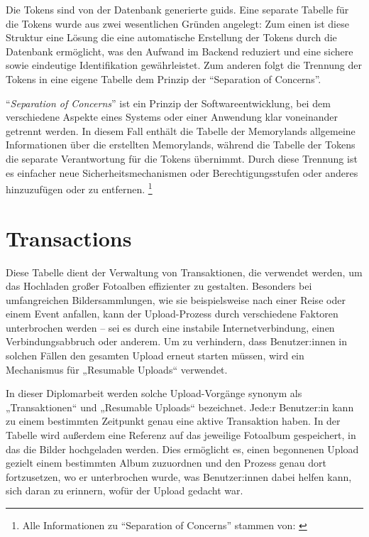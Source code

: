 Die Tokens sind von der Datenbank generierte \gls{guid}s. Eine separate Tabelle für die 
Tokens wurde aus zwei wesentlichen Gründen angelegt: Zum einen ist diese Struktur eine Lösung
die eine automatische Erstellung der Tokens durch die Datenbank ermöglicht, was den 
Aufwand im Backend reduziert und eine sichere sowie eindeutige Identifikation gewährleistet. 
Zum anderen folgt die Trennung der Tokens in eine eigene Tabelle dem Prinzip der 
``Separation of Concerns''.

``\emph{Separation of Concerns}'' ist ein Prinzip der Softwareentwicklung, bei dem 
verschiedene Aspekte eines Systems oder einer Anwendung klar voneinander getrennt werden. 
In diesem Fall enthält die Tabelle der Memorylands allgemeine Informationen über die 
erstellten Memorylands, während die Tabelle der Tokens die separate Verantwortung 
für die Tokens übernimmt. Durch diese Trennung ist es einfacher neue Sicherheitsmechanismen 
oder Berechtigungsstufen oder anderes hinzuzufügen oder zu entfernen.
\footnote{Alle Informationen zu ``Separation of Concerns'' stammen von: \cite{kulkarni2003separation}}

\section{Transactions}

Diese Tabelle dient der Verwaltung von Transaktionen, die verwendet werden, um das Hochladen 
großer Fotoalben effizienter zu gestalten. Besonders bei umfangreichen Bildersammlungen, 
wie sie beispielsweise nach einer Reise oder einem Event anfallen, kann der Upload-Prozess 
durch verschiedene Faktoren unterbrochen werden -- sei es durch eine instabile 
Internetverbindung, einen Verbindungsabbruch oder anderem. Um zu verhindern, dass 
Benutzer:innen in solchen Fällen den gesamten Upload erneut starten müssen, wird ein 
Mechanismus für „Resumable Uploads“ verwendet.

In dieser Diplomarbeit werden solche Upload-Vorgänge synonym als „Transaktionen“ und 
„Resumable Uploads“ bezeichnet. Jede:r Benutzer:in kann zu einem bestimmten Zeitpunkt 
genau eine aktive Transaktion haben. In der Tabelle wird außerdem eine Referenz auf 
das jeweilige Fotoalbum gespeichert, in das die Bilder hochgeladen werden. 
Dies ermöglicht es, einen begonnenen Upload gezielt einem bestimmten Album zuzuordnen 
und den Prozess genau dort fortzusetzen, wo er unterbrochen wurde, was Benutzer:innen
dabei helfen kann, sich daran zu erinnern, wofür der Upload gedacht war.

